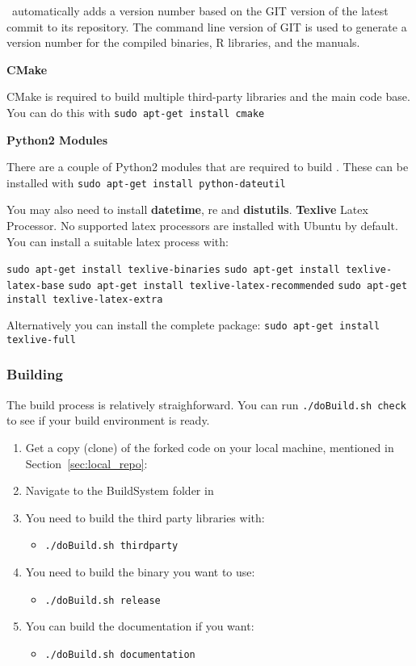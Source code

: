 \CNAME\ automatically adds a version number based on the GIT version of the latest commit to its repository. The command line version of GIT is used  to generate a version number for the compiled binaries, R libraries, and the manuals. 

\textbf{CMake}

CMake is required to build multiple third-party libraries and the main code base. You can do this with \texttt{sudo apt-get install cmake}

\textbf{Python2 Modules}

There are a couple of Python2 modules that are required to build \CNAME. These can be installed with \texttt{sudo apt-get install python-dateutil}

You may also need to install \textbf{datetime}, re and \textbf{distutils}. \textbf{Texlive} Latex Processor. No supported latex processors are installed with Ubuntu by default. You can install a suitable latex process with:

\texttt{sudo apt-get install texlive-binaries}
\texttt{sudo apt-get install texlive-latex-base}
\texttt{sudo apt-get install texlive-latex-recommended}
\texttt{sudo apt-get install texlive-latex-extra}

Alternatively you can install the complete package:
\texttt{sudo apt-get install texlive-full}

\subsubsection{Building \CNAME}

The build process is relatively straighforward. You can run \texttt{./doBuild.sh check} to see if your build environment is ready.

\begin{enumerate}
	\item Get a copy (clone) of the forked code on your local machine, mentioned in Section~\ref{sec:local_repo}: 
	\item Navigate to the BuildSystem folder in 
	\item You need to build the third party libraries with:
	\begin{itemize}
	    \item \texttt{./doBuild.sh thirdparty}
	\end{itemize}
	\item You need to build the binary you want to use:
	\begin{itemize}
		\item \texttt{./doBuild.sh release}
	\end{itemize}	
	\item You can build the documentation if you want:
	\begin{itemize}
		\item \texttt{./doBuild.sh documentation}
	\end{itemize}		
\end{enumerate}


